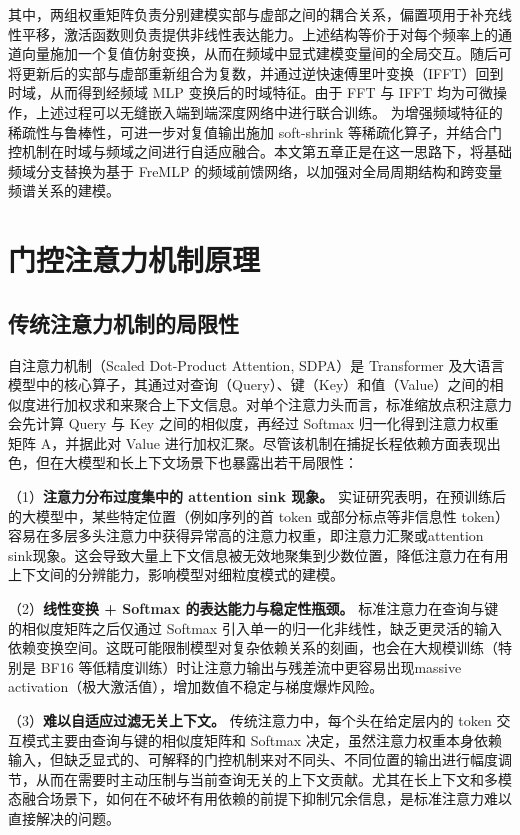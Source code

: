 其中，两组权重矩阵负责分别建模实部与虚部之间的耦合关系，偏置项用于补充线性平移，激活函数则负责提供非线性表达能力。上述结构等价于对每个频率上的通道向量施加一个复值仿射变换，从而在频域中显式建模变量间的全局交互。随后可将更新后的实部与虚部重新组合为复数，并通过逆快速傅里叶变换（IFFT）回到时域，从而得到经频域 MLP 变换后的时域特征。由于 FFT 与 IFFT 均为可微操作，上述过程可以无缝嵌入端到端深度网络中进行联合训练。 为增强频域特征的稀疏性与鲁棒性，可进一步对复值输出施加 soft-shrink 等稀疏化算子，并结合门控机制在时域与频域之间进行自适应融合。本文第五章正是在这一思路下，将基础频域分支替换为基于 FreMLP 的频域前馈网络，以加强对全局周期结构和跨变量频谱关系的建模。 \section{门控注意力机制原理} \subsection{传统注意力机制的局限性} 自注意力机制（Scaled Dot-Product Attention, SDPA）是 Transformer 及大语言模型中的核心算子，其通过对查询（Query）、键（Key）和值（Value）之间的相似度进行加权求和来聚合上下文信息。对单个注意力头而言，标准缩放点积注意力会先计算 Query 与 Key 之间的相似度，再经过 Softmax 归一化得到注意力权重矩阵 A，并据此对 Value 进行加权汇聚。尽管该机制在捕捉长程依赖方面表现出色，但在大模型和长上下文场景下也暴露出若干局限性：

（1）\textbf{注意力分布过度集中的 attention sink 现象。} 实证研究表明，在预训练后的大模型中，某些特定位置（例如序列的首 token 或部分标点等非信息性 token）容易在多层多头注意力中获得异常高的注意力权重，即注意力汇聚或attention sink现象\cite{gu2024attentionsink}。这会导致大量上下文信息被无效地聚集到少数位置，降低注意力在有用上下文间的分辨能力，影响模型对细粒度模式的建模。

（2）\textbf{线性变换 + Softmax 的表达能力与稳定性瓶颈。} 标准注意力在查询与键的相似度矩阵之后仅通过 Softmax 引入单一的归一化非线性，缺乏更灵活的输入依赖变换空间。这既可能限制模型对复杂依赖关系的刻画，也会在大规模训练（特别是 BF16 等低精度训练）时让注意力输出与残差流中更容易出现massive activation（极大激活值），增加数值不稳定与梯度爆炸风险\cite{sun2024massive}。

（3）\textbf{难以自适应过滤无关上下文。} 传统注意力中，每个头在给定层内的 token 交互模式主要由查询与键的相似度矩阵和 Softmax 决定，虽然注意力权重本身依赖输入，但缺乏显式的、可解释的门控机制来对不同头、不同位置的输出进行幅度调节，从而在需要时主动压制与当前查询无关的上下文贡献。尤其在长上下文和多模态融合场景下，如何在不破坏有用依赖的前提下抑制冗余信息，是标准注意力难以直接解决的问题。

